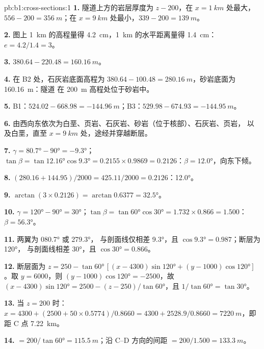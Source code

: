 \begin{solution}{pb:b1:cross-sections:1}
\textbf{1.} 隧道上方的岩层厚度为 $z - 200$，在
$x = \qty{1}{km}$ 处最大，$556 - 200 = \qty{356}{m}$；在 $x =
\qty{9}{km}$ 处最小，$339 - 200 = \qty{139}{m}$。

\textbf{2.} 图上 \qty{1}{km} 的高程量得 \qty{4.2}{cm}，\qty{1}{km}
的水平距离量得 \qty{1.4}{cm}：$e = 4.2/1.4 = 3$。

\textbf{3.} $380.64 - 220.48 = \qty{160.16}{m}$。

\textbf{4.} 在 B2 处，石灰岩底面高程为 $380.64 - 100.48 =
\qty{280.16}{m}$，砂岩底面为 \qty{160.16}{m}：隧道
在 \qty{200}{m} 高程处位于砂岩中。

\textbf{5.} B1：$524.02 - 668.98 = \qty{-144.96}{m}$；B3：$529.98 - 674.93 =
\qty{-144.95}{m}$。

\textbf{6.} 由西向东依次为白垩、页岩、石灰岩、砂岩（位于核部）、石灰岩、页岩，
以及白垩，直至
$x = \qty{9}{km}$ 处，途经并穿越断层。

\textbf{7.} $\gamma = \ang{80.7} - \ang{90} = \ang{-9.3}$；$\tan\beta =
\tan\ang{12.16}\cos\ang{9.3} = 0.2155\times0.9869 = 0.2126$：$\beta =
\ang{12.0}$，向东下倾。

\textbf{8.} $(280.16 + 144.95)/2000 = 425.11/2000 = 0.2126$：\ang{12.0}。

\textbf{9.} $\arctan(3\times0.2126) = \arctan 0.6377 = \ang{32.5}$。

\textbf{10.} $\gamma = \ang{120} - \ang{90} = \ang{30}$；$\tan\beta =
\tan\ang{60}\cos\ang{30} = 1.732\times0.866 = 1.500$：$\beta = \ang{56.3}$。

\textbf{11.} 两翼为 \ang{080.7} 或 \ang{279.3}，
与剖面线仅相差 \ang{9.3}，且 $\cos\ang{9.3} = 0.987$；断层为 \ang{120}，
与剖面线相差 \ang{30}，且 $\cos\ang{30} = 0.866$。

\textbf{12.} 断层面为 $z = 250 - \tan\ang{60}\,[(x - 4300)
\sin\ang{120} + (y - 1000)\cos\ang{120}]$。取 $y = 6000$，则 $(y - 1000)
\cos\ang{120} = -2500$，故 $(x - 4300)\sin\ang{120} = 2500 - (z - 250)/
\tan\ang{60}$，且 $1/\tan\ang{60} = \tan\ang{30}$。

\textbf{13.} 当 $z = 200$ 时：$x = 4300 + (2500 + 50\times0.5774)/0.8660 =
4300 + 2528.9/0.8660 = \qty{7220}{m}$，即距 C 点 \qty{7.22}{km}。

\textbf{14.}  $= 200/\tan\ang{60} = \qty{115.5}{m}$；沿
C--D 方向的间距 $= 200/1.500 = \qty{133.3}{m}$。


\end{solution}
